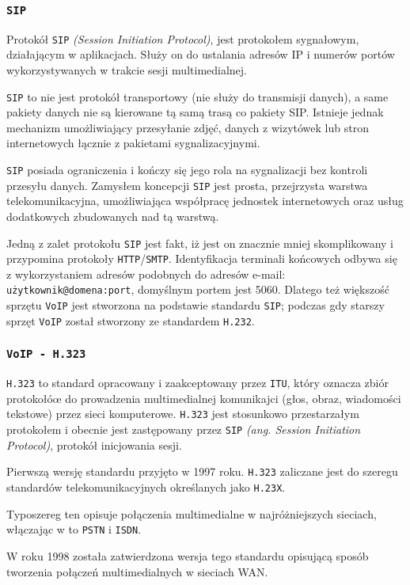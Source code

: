 \documentclass[a4paper]{article}
\begin{document}
\subsubsection{\tt SIP}
Protokół {\tt SIP} \emph{(Session Initiation Protocol)}, jest protokołem sygnałowym,
działającym w aplikacjach. Służy on do ustalania adresów IP i numerów portów
wykorzystywanych w trakcie sesji multimedialnej.

{\tt SIP} to nie jest protokół transportowy (nie służy do transmisji danych),
a same pakiety danych nie są kierowane tą samą trasą co pakiety SIP.
Istnieje jednak mechanizm umożliwiający przesyłanie zdjęć, danych z wizytówek
lub stron internetowych łącznie z pakietami sygnalizacyjnymi.

{\tt SIP} posiada ograniczenia i kończy się jego rola na sygnalizacji bez kontroli
przesyłu danych. Zamysłem koncepcji {\tt SIP} jest prosta, przejrzysta warstwa
telekomunikacyjna, umożliwiająca współpracę jednostek internetowych oraz usług dodatkowych
zbudowanych nad tą warstwą.

Jedną z zalet protokołu {\tt SIP} jest fakt, iż jest on znacznie mniej skomplikowany
i przypomina protokoły {\tt HTTP}/{\tt SMTP}. Identyfikacja terminali końcowych odbywa się z
wykorzystaniem adresów podobnych do adresów e-mail: {\tt użytkownik@domena:port},
domyślnym portem jest 5060.
Dlatego też większość sprzętu {\tt VoIP} jest stworzona na podstawie standardu {\tt SIP};
podczas gdy starszy sprzęt {\tt VoIP} został stworzony ze standardem {\tt H.232}.
\subsubsection{\tt VoIP - H.323}
{\tt H.323} to standard opracowany i zaakceptowany przez {\tt ITU}, który oznacza zbiór
protokołóœ do prowadzenia multimedialnej komunikajci (głos, obraz, wiadomości tekstowe)
przez sieci komputerowe. {\tt H.323} jest stosunkowo przestarzałym protokołem i obecnie
jest zastępowany przez {\tt SIP} \emph{(ang. Session Initiation Protocol)}, protokół
inicjowania sesji.

Pierwszą wersję standardu przyjęto w 1997 roku. {\tt H.323} zaliczane jest do szeregu
standardów telekomunikacyjnych określanych jako {\tt H.23X}.

Typoszereg ten opisuje połączenia multimedialne w najróżniejszych sieciach, włączając w to
{\tt PSTN} i {\tt ISDN}.

W roku 1998 została zatwierdzona wersja tego standardu opisującą sposób tworzenia połączeń
multimedialnych w sieciach WAN.
\end{document}
